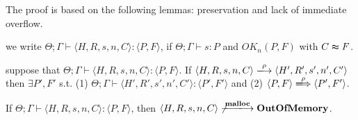 The proof is based on the following lemmas: preservation and lack of
immediate overflow.


\begin{myDef}
  \label{df:Rdu}
 we write \( \Theta; \Gamma \vdash \langle H, R, s, n, C \rangle : \langle P,
  F \rangle\), if \(\Theta; \Gamma \vdash s : P\) and \(OK_n(P, F)\) with \(C \thickapprox F\).  
\end{myDef}

 
\begin{lemma}[Preservation]
\label{lem:preservation}
suppose that \( \Theta; \Gamma \vdash \langle H, R, s, n, C \rangle :
\langle P, F \rangle\). If \( \langle H, R, s, n, C \rangle
\xlongrightarrow{\rho} \langle H', R', s', n', C' \rangle\) then
\(\exists P', F'\) s.t. (1) \( \Theta; \Gamma \vdash \langle H', R',
s', n', C' \rangle : \langle P', F' \rangle\) and (2) \(\langle P, F
\rangle \xLongrightarrow{\rho} \langle P', F'\rangle \).
\end{lemma}



\begin{lemma}
\label{lem:immediateSafety}
If \( \Theta; \Gamma \vdash \langle H, R, s, n, C \rangle :
\langle P, F \rangle\), then \(\langle H, R, s, n, C \rangle
\not\xlongrightarrow{\Malloc} \OVERFLOW \).
\end{lemma}
